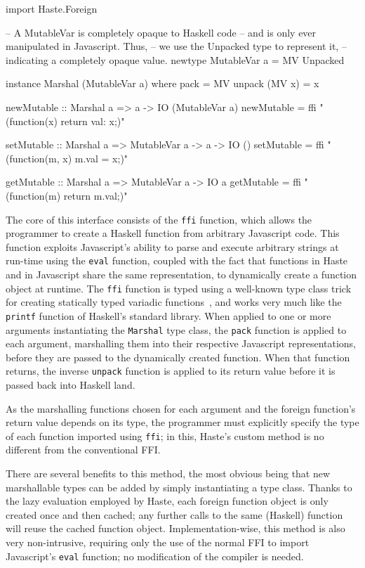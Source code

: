 \documentclass[preprint]{sigplanconf}
\begin{document}
\begin{code}
import Haste.Foreign

-- A MutableVar is completely opaque to Haskell code
-- and is only ever manipulated in Javascript. Thus,
-- we use the Unpacked type to represent it,
-- indicating a completely opaque value.
newtype MutableVar a = MV Unpacked

instance Marshal (MutableVar a) where
  pack          = MV
  unpack (MV x) = x

newMutable :: Marshal a => a -> IO (MutableVar a)
newMutable = ffi "(function(x) {return {val: x};})"

setMutable :: Marshal a => MutableVar a -> a -> IO ()
setMutable = ffi "(function(m, x) {m.val = x;})"

getMutable :: Marshal a => MutableVar a -> IO a
getMutable = ffi "(function(m) {return m.val;})"
\end{code}

The core of this interface consists of the \lstinline!ffi! function, which
allows the programmer to create a Haskell function from arbitrary Javascript
code. This function exploits Javascript's ability to parse and execute
arbitrary strings at run-time using the \lstinline!eval! function, coupled with
the fact that functions in Haste and in Javascript share the same
representation, to dynamically create a function object at runtime.
The \lstinline!ffi! function is typed using a well-known type class trick for
creating statically typed variadic functions\ \cite{printf}, and works very
much like the \lstinline!printf! function of Haskell's standard library.
When applied to one or more arguments instantiating the \lstinline!Marshal!
type class, the \lstinline!pack! function is applied to each argument,
marshalling them into their respective Javascript representations, before they
are passed to the dynamically created function. When that function returns,
the inverse \lstinline!unpack! function is applied to its return value before
it is passed back into Haskell land.

As the marshalling functions chosen for each argument and the foreign
function's return value depends on its type, the programmer must explicitly
specify the type of each function imported using \lstinline!ffi!; in this,
Haste's custom method is no different from the conventional FFI.

There are several benefits to this method, the most obvious being that new
marshallable types can be added by simply instantiating a type class. Thanks
to the lazy evaluation employed by Haste, each foreign function object is only
created once and then cached; any further calls to the same (Haskell) function
will reuse the cached function object. Implementation-wise, this method is also
very non-intrusive, requiring only the use of the normal FFI to import
Javascript's \lstinline!eval! function; no modification of the compiler is
needed.
\end{document}
